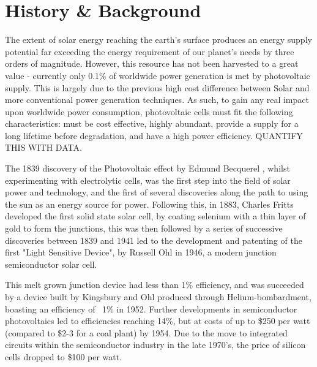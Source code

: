 \documentclass[11pt,a4paper,twoside]{article}
\begin{document}

\section{History \& Background}

The extent of solar energy reaching the earth's surface produces an energy supply potential far exceeding the energy requirement of our planet's needs by three orders of magnitude.\citep{Morton2006} However, this resource has not been harvested to a great value - currently only 0.1\% of worldwide power generation is met by photovoltaic supply. \citep{Mitzi2011} This is largely due to the previous high cost difference between Solar and more conventional power generation techniques. As such, to gain any real impact upon worldwide power consumption, photovoltaic cells must fit the following characteristics: must be cost effective, highly abundant, provide a supply for a long lifetime before degradation, and have a high power efficiency. QUANTIFY THIS WITH DATA.


The 1839 discovery of the Photovoltaic effect by Edmund Becquerel \citep{Nelson2003}, whilst experimenting with electrolytic cells, was the first step into the field of solar power and technology, and the first of several discoveries along the path to using the sun as an energy source for power. Following this, in 1883, Charles Fritts \citep{Fritts1883} developed the first solid state solar cell, by coating selenium with a thin layer of gold to form the junctions, this was then followed by a series of successive discoveries between 1839 and 1941 led to the development and patenting of the first "Light Sensitive Device", by Russell Ohl in 1946, a modern junction semiconductor solar cell. \citep{Green2009a} 

This melt grown junction device had less than 1\% efficiency, and was succeeded by a device built by Kingsbury and Ohl produced through Helium-bombardment, boasting an efficiency of ~1\% in 1952. \citep{Green2009a} Further developments in semiconductor photovoltaics led to efficiencies reaching 14\%, but at costs of up to \$250 per watt (compared to \$2-3 for a coal plant) by 1954. Due to the move to integrated circuits within the semiconductor industry in the late 1970's, the price of silicon cells dropped to \$100 per watt.
\end{document}
